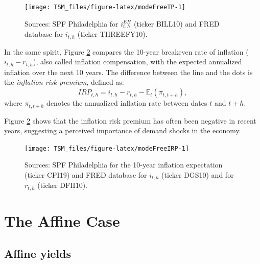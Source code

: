 \documentclass[
  12pt,
]{book}
\theoremstyle{definition}
\theoremstyle{definition}
\theoremstyle{definition}
\theoremstyle{definition}
\theoremstyle{remark}
\begin{document}
\begin{figure}
\texttt{[image: TSM\_files/figure-latex/modeFreeTP-1]} \caption{Sources: SPF Philadelphia for $i_{t,h}^{EH}$ (ticker BILL10) and FRED database for $i_{t,h}$ (ticker THREEFY10).}\label{fig:modeFreeTP}
\end{figure}

In the same spirit, Figure \ref{fig:modeFreeIRP} compares the 10-year breakeven rate of inflation (\(i_{t,h}- r_{t,h}\)), also called inflation compensation, with the expected annualized inflation over the next 10 years. The difference between the line and the dots is the \emph{inflation risk premium}, defined as:
\[
IRP_{t,h} = i_{t,h} - r_{t,h} - \mathbb{E}_t(\pi_{t,t+h}),
\]
where \(\pi_{t,t+h}\) denotes the annualized inflation rate between dates \(t\) and \(t+h\).

Figure \ref{fig:modeFreeIRP} shows that the inflation risk premium has often been negative in recent years, suggesting a perceived importance of demand shocks in the economy.

\begin{figure}
\texttt{[image: TSM\_files/figure-latex/modeFreeIRP-1]} \caption{Sources: SPF Philadelphia for the 10-year inflation expectation (ticker CPI19) and FRED database for $i_{t,h}$ (ticker DGS10) and for $r_{t,h}$ (ticker DFII10).}\label{fig:modeFreeIRP}
\end{figure}

\hypertarget{RiskFreeAffine}{%
\section{The Affine Case}\label{RiskFreeAffine}}

\hypertarget{AffineYields}{%
\subsection{Affine yields}\label{AffineYields}}
\end{document}
